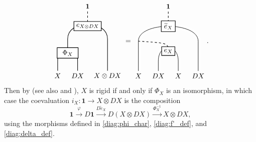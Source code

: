 \documentclass[11pt, reqno]{amsart}
\theoremstyle{definition}\newtheorem{defi}[thm]{Definition}
\theoremstyle{definition}\newtheorem{rem}[thm]{Remark}
\theoremstyle{definition}\newtheorem{exam}[thm]{Example}
\theoremstyle{definition}\newtheorem{assum}[thm]{Assumption}
\newcommand{\til}{\widetilde}
\newcommand{\vac}{\mathbf{1}}
\begin{document}
\begin{equation}\label{diag:Phi-def}
 \begin{matrix}
    \begin{tikzpicture}[scale = 1, baseline = {(current bounding box.center)}, line width=0.75pt]
    \draw (0,0) -- (0,.5) .. controls (0,.8) .. (.5,.8) .. controls (1,.8) .. (1,.5) -- (1,0);
    \draw[dashed] (1.5, 2.25) -- (1.5,3);
    \draw (.5,1) -- (.5,1.6) .. controls (.5,2.6) and (2.5,2.6) .. (2.5,1.6) -- (2.5, 1);
    \draw (2.5,0) -- (2.5,1);
    \node at (0,-.25) {$X$};
    \node at (1,-.25) {$DX$};
    \node at (2.5,-.25) {$X\otimes DX$};
    \node at (1.5,3.25) {$\vac$};
    \node at (.5,.9) [draw,minimum width=30pt,minimum height=10pt,thick, fill=white] {$\Phi_{X}$};
    \node at (1.5,2.25) [draw,minimum width=20pt,minimum height=10pt,thick, fill=white] {$e_{X\otimes DX}$};
    \end{tikzpicture}
   \end{matrix} =
   \begin{matrix}
    \begin{tikzpicture}[scale = 1, baseline = {(current bounding box.center)}, line width=0.75pt]
     \draw[white, double=black, line width = 3pt ] (1,0) -- (1,.5) .. controls (1,1.4) and (2,1.4) .. (2,0.5) -- (2,0);                      
    \draw[white, double=black, line width = 3pt ] (0,0) -- (0,1.5) .. controls (0,2.5) and (3,2.5) .. (3,1.5) -- (3,0);
    \draw[dashed] (1.5,1) .. controls (1.5,1.4) .. (0,1.5);
    \draw[dashed] (1.5,2.25) -- (1.5,3);
    \node at (0,-.25) {$X$};
    \node at (1,-.25) {$DX$};
    \node at (2,-.25) {$X$};
    \node at (3,-.25) {$DX$};
    \node at (1.5,3.25) {$\vac$};
    \node at (1.5,1) [draw,minimum height=10pt,thick, fill=white] {$e_X$};
    \node at (1.5,2.25) [draw,minimum width=20pt,minimum height=10pt,thick, fill=white] {$\til{e}_X$};
    \end{tikzpicture}
   \end{matrix}.
\end{equation}
Then by \cite[Corollary 3.6]{BD} (see also \cite[Proposition 4.4.5]{CMY2} and \cite[Proposition 3.2]{McR}), $X$ is rigid if and only if $\Phi_X$ is an isomorphism, in which case the coevaluation $i_X: \vac\rightarrow X\otimes DX$ is the composition
\begin{equation}\label{eqn:i_X-def}
\vac \xrightarrow{\varphi} D\vac \xrightarrow{D\til{e}_X} D(X\otimes DX)\xrightarrow{\Phi_X^{-1}} X\otimes DX,
\end{equation}
using the morphisms defined in \eqref{diag:phi_char}, \eqref{diag:f'_def}, and \eqref{diag:delta_def}.
\end{document}
